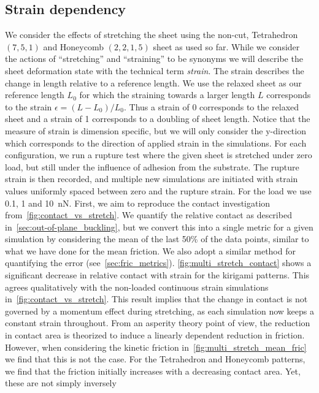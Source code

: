 \subsection{Strain dependency}\label{sec:stretch_dependency}
We consider the effects of stretching the sheet using the non-cut, Tetrahedron
$(7,5,1)$ and Honeycomb $(2,2,1,5)$ sheet as used so far. While we consider the
actions of ``stretching'' and ``straining'' to be synonyms we will describe the
sheet deformation state with the technical term \textit{strain}. The strain
describes the change in length relative to a reference length. We use the
relaxed sheet as our reference length $L_0$ for which the straining towards a
larger length $L$ corresponds to the strain $\epsilon = (L-L_0)/L_0$. Thus a strain of
0 corresponds to the relaxed sheet and a strain of 1 corresponds to a doubling
of sheet length. Notice that the measure of strain is dimension specific, but we will only consider the y-direction which corresponds to the direction of applied strain in the simulations. For each configuration, we run a rupture
test where the given sheet is stretched under zero load, but still under the
influence of adhesion from the substrate. The rupture strain is then recorded,
and multiple new simulations are initiated with strain values uniformly spaced between zero and the rupture strain. For the load we use 0.1, 1 and \SI{10}{nN}. First, we aim to reproduce
the contact investigation from~\cref{fig:contact_vs_stretch}. We quantify the
relative contact as described in~\cref{sec:out-of-plane_buckling}, but we
convert this into a single metric for a given simulation by considering the
mean of the last 50\% of the data points, similar to what we have done for
the mean friction. We also adopt a similar method for quantifying the error
(see~\cref{sec:fric_metrics}). \cref{fig:multi_stretch_contact} shows a significant decrease in
relative contact with strain for the kirigami patterns. This agrees
qualitatively with the non-loaded continuous strain simulations
in~\cref{fig:contact_vs_stretch}. This result implies that the change in contact
is not governed by a momentum effect during stretching, as each simulation now
keeps a constant strain throughout. From an asperity theory point of view, the
reduction in contact area is theorized to induce a linearly dependent reduction in
friction. However, when considering the kinetic friction
in~\cref{fig:multi_stretch_mean_fric} we find that this is not the case. For the
Tetrahedron and Honeycomb patterns, we find that the friction initially
increases with a decreasing contact area. Yet, these are not simply inversely
